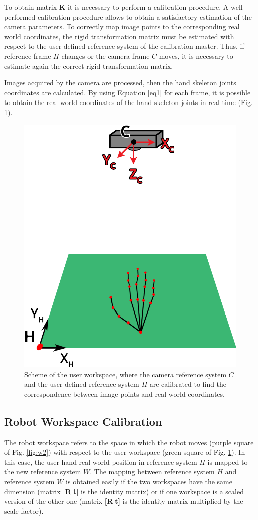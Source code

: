 \documentclass[letterpaper, 10 pt, conference]{ieeeconf}  %
\begin{document}
To obtain matrix \textbf{K} it is necessary to perform a calibration procedure. A well-performed calibration procedure allows to obtain a satisfactory estimation of the camera parameters. To correctly map image points to the corresponding real world coordinates, the rigid transformation matrix must be estimated with respect to the user-defined reference system of the calibration master. Thus, if reference frame $H$ changes or the camera frame $C$ moves, it is necessary to estimate again the correct rigid transformation matrix. %

Images acquired by the camera are processed, then the hand skeleton joints coordinates are calculated. By using Equation \ref{eq1} for each frame, it is possible to obtain the real world coordinates of the hand skeleton joints in real time (Fig. \ref{fig:w1}).

\begin{figure} [h!]
  \centering
  \includegraphics[width=0.6\columnwidth]{figures/w1.png}
  \caption{Scheme of the user workspace, where the camera reference system $C$ and the user-defined reference system $H$ are calibrated to find the correspondence between image points and real world coordinates.}
  \label{fig:w1}
\end{figure}


\subsection{Robot Workspace Calibration}
The robot workspace refers to the space in which the robot moves (purple square of Fig. \ref{fig:w2}) with respect to the user workspace (green square of Fig. \ref{fig:w1}). In this case, the user hand real-world position in reference system $H$ is mapped to the new reference system $W$. The mapping between reference system $H$ and reference system $W$ is obtained easily if the two workspaces have the same dimension (matrix \textbf{[R$|$t]} is the identity matrix) or if one workspace is a scaled version of the other one (matrix \textbf{[R$|$t]} is the identity matrix multiplied by the scale factor). %
\end{document}
